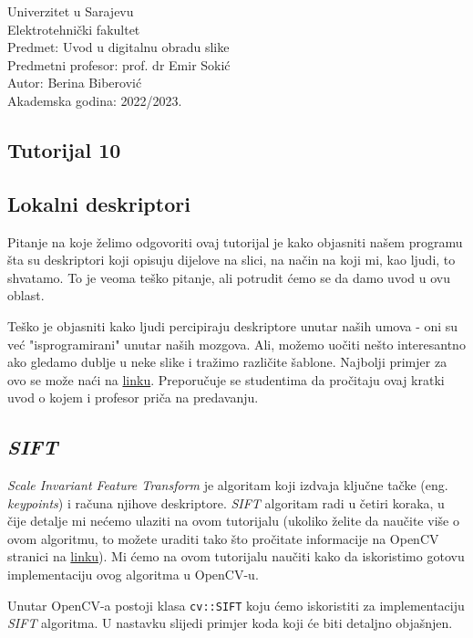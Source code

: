 \documentclass[a4paper, 12pt]{article}
\begin{document}
\noindent
Univerzitet u Sarajevu\\
Elektrotehnički fakultet\\
Predmet: Uvod u digitalnu obradu slike\\
Predmetni profesor: prof. dr Emir Sokić\\
Autor: Berina Biberović\\
Akademska godina: 2022/2023.


\begin{center}
    \section*{Tutorijal 10}
    \subsection*{Lokalni deskriptori}
\end{center}

Pitanje na koje želimo odgovoriti ovaj tutorijal je kako objasniti našem programu šta su deskriptori koji opisuju dijelove na slici, na način na koji mi, kao ljudi, to shvatamo. To je veoma teško pitanje, ali potrudit ćemo se da damo uvod u ovu oblast.

Teško je objasniti kako ljudi percipiraju deskriptore unutar naših umova - oni su već "isprogramirani" unutar naših mozgova. Ali, možemo uočiti nešto interesantno ako gledamo dublje u neke slike i tražimo različite šablone. Najbolji primjer za ovo se može naći na \href{https://docs.opencv.org/3.4/df/d54/tutorial_py_features_meaning.html}{linku}. Preporučuje se studentima da pročitaju ovaj kratki uvod o kojem i profesor priča na predavanju.

\subsection*{\textit{SIFT}}

\textit{Scale Invariant Feature Transform} je algoritam koji izdvaja ključne tačke (eng. \textit{keypoints}) i računa njihove deskriptore. \textit{SIFT} algoritam radi u četiri koraka, u čije detalje mi nećemo ulaziti na ovom tutorijalu (ukoliko želite da naučite više o ovom algoritmu, to možete uraditi tako što pročitate informacije na OpenCV stranici na \href{https://docs.opencv.org/3.4/da/df5/tutorial_py_sift_intro.html}{linku}). Mi ćemo na ovom tutorijalu naučiti kako da iskoristimo gotovu implementaciju ovog algoritma u OpenCV-u.

Unutar OpenCV-a postoji klasa \lstinline{cv::SIFT} koju ćemo iskoristiti za implementaciju \textit{SIFT} algoritma. U nastavku slijedi primjer koda koji će biti detaljno objašnjen.
\end{document}
